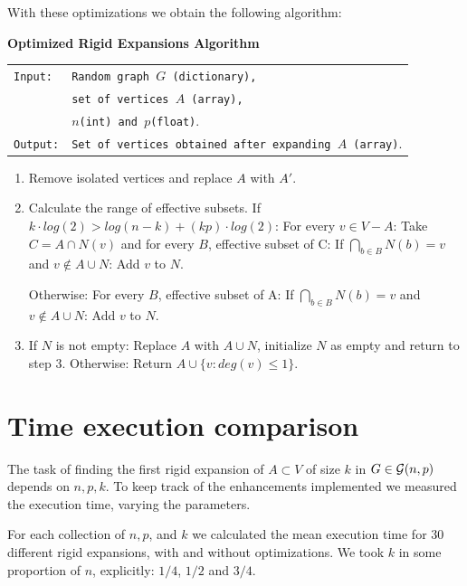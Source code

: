 With these optimizations we obtain the following algorithm:

\begin{cajita}
\textbf{Optimized Rigid Expansions Algorithm} \hfill \break

\begin{tabular}{ l l }
\texttt{Input:} &  \texttt{Random graph $G$ (dictionary),} \\
                &  \texttt{set of vertices $A$ (array),} \\
                &  \texttt{$n$(int) and $p$(float)}. \\
\texttt{Output:} & \texttt{Set of vertices obtained after expanding $A$ (array)}. \\
\end{tabular}
\begin{enumerate}
\item Remove isolated vertices and replace $A$ with $A'$.
\item Calculate the range of effective subsets.\hfill \break
If $k\cdot log(2) > log(n-k) + (kp)\cdot log(2)$: \hfill \break
\hphantom{12} For every $v\in V-A$:\hfill \break
\hphantom{1234} Take $C = A\cap N(v)$ and for every $B$, effective subset of C:\hfill \break
\hphantom{123456} If $\bigcap\limits_{b\in B} N(b) = v$ and $v\not\in A\cup N$: \hfill \break
\hphantom{12341234} Add $v$ to $N$.

Otherwise:\hfill \break
\hphantom{12} For every $B$, effective subset of A:\hfill \break
\hphantom{1234} If $\bigcap\limits_{b\in B} N(b) = v$ and $v\not\in A\cup N$: \hfill \break
\hphantom{123456} Add $v$ to $N$.

\item If $N$ is not empty: \hfill \break
\hphantom{12} Replace $A$ with $A\cup N$, initialize $N$ as empty and return to step 3. \hfill \break
      Otherwise:\hfill \break
\hphantom{12} Return $A\cup\{v: deg(v)\leq 1 \}$.
\end{enumerate}
\end{cajita}

\section{Time execution comparison}
The task of finding the first rigid expansion of $A\subset V$ of size $k$ in $G\in\mathcal{G}(n,p)$ depends on $n,p,k$. To keep track of the enhancements implemented we measured the execution time, varying the parameters.

For each collection of $n, p$, and $k$ we calculated the mean execution time for 30 different rigid expansions, with and without optimizations. We took $k$ in some proportion of $n$, explicitly: $1/4$, $1/2$ and $3/4$. 

